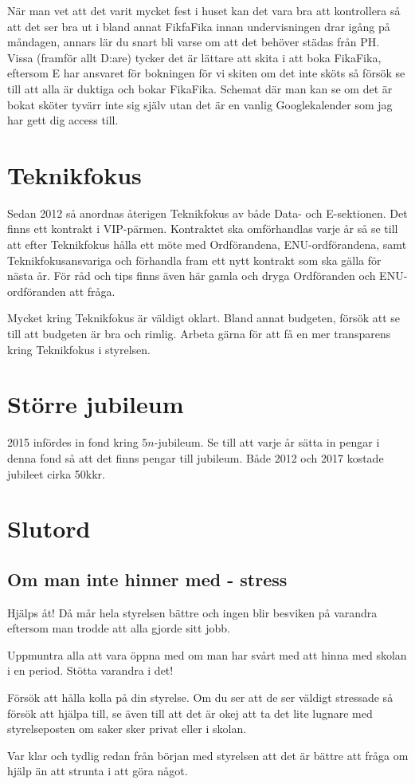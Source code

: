 \documentclass[10pt]{article}
\begin{document}
När man vet att det varit mycket fest i huset kan det vara bra att kontrollera så att det ser bra ut i bland annat FikfaFika innan undervisningen drar igång på måndagen, annars lär du snart bli varse om att det behöver städas från PH. Vissa (framför allt D:are) tycker det är lättare att skita i att boka FikaFika, eftersom E har ansvaret för bokningen för vi skiten om det inte sköts så försök se till att alla är duktiga och bokar FikaFika. Schemat där man kan se om det är bokat sköter tyvärr inte sig själv utan det är en vanlig Googlekalender som jag har gett dig access till.

\section{Teknikfokus}

Sedan 2012 så anordnas återigen Teknikfokus av både Data- och E-sektionen. Det finns ett kontrakt i VIP-pärmen. Kontraktet ska omförhandlas varje år så se till att efter Teknikfokus hålla ett möte med Ordförandena, ENU-ordförandena, samt Teknikfokusansvariga och förhandla fram ett nytt kontrakt som ska gälla för nästa år. För råd och tips finns även här gamla och dryga Ordföranden och ENU-ordföranden att fråga.

Mycket kring Teknikfokus är väldigt oklart. Bland annat budgeten, försök att se till att budgeten är bra och rimlig. Arbeta gärna för att få en mer transparens kring Teknikfokus i styrelsen.

\section{Större jubileum}

2015 infördes in fond kring $5n$-jubileum. Se till att varje år sätta in pengar i denna fond så att det finns pengar till jubileum. Både 2012 och 2017 kostade jubileet cirka 50kkr.

\section{Slutord}

\subsection{Om man inte hinner med - stress}

\begin{dashlist}
    \item Hjälps åt! Då mår hela styrelsen bättre och ingen blir besviken på varandra eftersom man trodde att alla gjorde sitt jobb.
    \item Uppmuntra alla att vara öppna med om man har svårt med att hinna med skolan i en period. Stötta varandra i det!
    \item Försök att hålla kolla på din styrelse. Om du ser att de ser väldigt stressade så försök att hjälpa till, se även till att det är okej att ta det lite lugnare med styrelseposten om saker sker privat eller i skolan.
    \item Var klar och tydlig redan från början med styrelsen att det är bättre att fråga om hjälp än att strunta i att göra något.
\end{dashlist}
\end{document}
